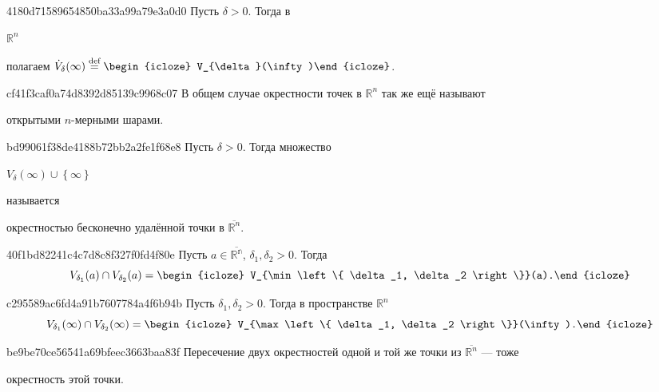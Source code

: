 \begin{note}{4180d71589654850ba33a99a79e3a0d0}
    Пусть \({ \delta > 0 }\). Тогда в \begin{icloze}{2}\({ \mathbb R^{n} }\)\end{icloze} полагаем \({ \dot V_{\delta}(\infty) \overset{\text{def}}= \begin{icloze}{1}V_{\delta}(\infty)\end{icloze} }\).
\end{note}

\begin{note}{cf41f3caf0a74d8392d85139c9968c07}
    В общем случае окрестности точек в \({ \mathbb R^{n} }\) так же ещё называют \begin{icloze}{1}открытыми \({ n }\)-мерными шарами.\end{icloze}
\end{note}

\begin{note}{bd99061f38de4188b72bb2a2fe1f68e8}
    Пусть \({ \delta >  0 }\). Тогда множество \begin{icloze}{1}\({ V_{\delta}(\infty) \cup \left\{ \infty \right\} }\)\end{icloze} называется \begin{icloze}{2}окрестностью бесконечно  удалённой точки в \({ \overline{\mathbb R^{n}} }\).\end{icloze}
\end{note}

\begin{note}{40f1bd82241c4c7d8c8f327f0fd4f80e}
    Пусть \({ a \in \mathbb \overline{\mathbb R^{n}} }\),\: \({ \delta_1, \delta_2 > 0 }\).
    Тогда
    \[
        V_{\delta_1}(a) \cap V_{\delta_2}(a) = \begin{icloze}{1}V_{\min \left\{ \delta_1, \delta_2 \right\}}(a).\end{icloze}
    \]
\end{note}

\begin{note}{c295589ac6fd4a91b7607784a4f6b94b}
    Пусть \({ \delta_1, \delta_2 > 0 }\).
    Тогда в пространстве \({ \mathbb R^{n} }\)
    \[
        V_{\delta_1}(\infty) \cap V_{\delta_2}(\infty) = \begin{icloze}{1}V_{\max \left\{ \delta_1, \delta_2 \right\}}(\infty).\end{icloze}
    \]
\end{note}

\begin{note}{be9be70ce56541a69bfeec3663baa83f}
    Пересечение двух окрестностей одной и той же точки из \({ \overline{\mathbb R^{n}} }\) --- тоже \begin{icloze}{1}окрестность этой точки.\end{icloze}
\end{note}

